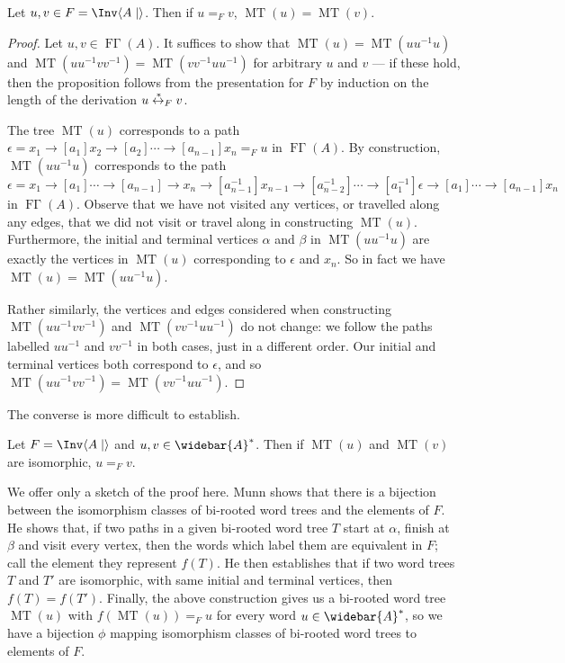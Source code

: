 \documentclass[noindex,noinsetproof,emphthm,12pt]{lmaths}
\newcommand{\leftrightst}{\mathrel{\smash{\stackrel{\hspace{0.1em}\ast}{\leftrightarrow}}}}
\newcommand{\Abar}{\widebar{A}}
\DeclareMathOperator{\FGamma}{F\Gamma}
\DeclareMathOperator{\MT}{MT}
\begin{document}
\begin{prop}
	Let $u, v \in F = \Inv \langle A \mid\rangle$. Then if $u =_F v$, $\MT(u) = \MT(v)$.
\end{prop}
\begin{proof}
	Let $u, v \in \FGamma(A)$. It suffices to show that $\MT(u) = \MT(uu^{-1}u)$ and $\MT(uu^{-1}vv^{-1}) = \MT(vv^{-1}uu^{-1})$ for arbitrary $u$ and $v$ --- if these hold, then the proposition follows from the presentation for $F$ by induction on the length of the derivation $u \leftrightst_{F} v$.

	The tree $\MT(u)$ corresponds to a path $\epsilon = x_1 \to[a_1] x_2 \to[a_2] \cdots \to[a_{n-1}] x_n =_F u$ in $\FGamma(A)$. By construction, $\MT(uu^{-1}u)$ corresponds to the path $\epsilon = x_1 \to[a_1] \cdots \to[a_{n-1}] \to x_n \to[a_{n-1}^{-1}] x_{n-1} \to[a_{n-2}^{-1}] \cdots \to[a_1^{-1}] \epsilon \to[a_1] \cdots \to[a_{n-1}] x_n$ in $\FGamma(A)$. Observe that we have not visited any vertices, or travelled along any edges, that we did not visit or travel along in constructing $\MT(u)$. Furthermore, the initial and terminal vertices $\alpha$ and $\beta$ in $\MT(uu^{-1}u)$ are exactly the vertices in $\MT(u)$ corresponding to $\epsilon$ and $x_n$. So in fact we have $\MT(u) = \MT(uu^{-1}u)$.

	Rather similarly, the vertices and edges considered when constructing $\MT(uu^{-1}vv^{-1})$ and $\MT(vv^{-1}uu^{-1})$ do not change: we follow the paths labelled $uu^{-1}$ and $vv^{-1}$ in both cases, just in a different order. Our initial and terminal vertices both correspond to $\epsilon$, and so $\MT(uu^{-1}vv^{-1}) = \MT(vv^{-1}uu^{-1})$.
\end{proof}

The converse is more difficult to establish.
\begin{prop}
	Let $F = \Inv \langle A \mid\rangle$ and $u, v \in \Abar^*$. Then if $\MT(u)$ and $\MT(v)$ are isomorphic, $u =_F v$.\label{prop:MT-isomorphic-u=Fv}
\end{prop}
We offer only a sketch of the proof here. Munn shows that there is a bijection between the isomorphism classes of bi-rooted word trees and the elements of $F$. He shows that, if two paths in a given bi-rooted word tree $T$ start at $\alpha$, finish at $\beta$ and visit every vertex, then the words which label them are equivalent in $F$; call the element they represent $f(T)$. He then establishes that if two word trees $T$ and $T'$ are isomorphic, with same initial and terminal vertices, then $f(T) = f(T')$. Finally, the above construction gives us a bi-rooted word tree $\MT(u)$ with $f(\MT(u)) =_F u$ for every word $u \in \Abar^*$, so we have a bijection $\phi$ mapping isomorphism classes of bi-rooted word trees to elements of $F$.
\end{document}

